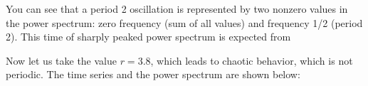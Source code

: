 \documentclass[
  letterpaper,
  DIV=11,
  numbers=noendperiod]{scrreprt}
\begin{document}
You can see that a period 2 oscillation is represented by two nonzero
values in the power spectrum: zero frequency (sum of all values) and
frequency 1/2 (period 2). This time of sharply peaked power spectrum is
expected from

Now let us take the value \(r=3.8\), which leads to chaotic behavior,
which is not periodic. The time series and the power spectrum are shown
below:

\begin{figure}

\begin{minipage}{0.50\linewidth}



\end{minipage}%
%
\begin{minipage}{0.50\linewidth}

\end{minipage}
\end{figure}
\end{document}
